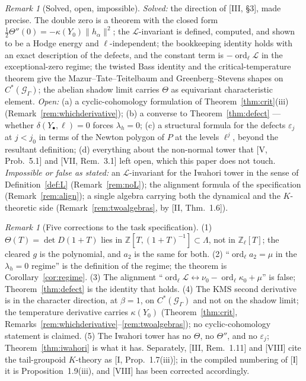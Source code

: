 \documentclass[11pt]{amsart}
\numberwithin{equation}{section}
\theoremstyle{definition}
\theoremstyle{remark}
\newtheorem{remark}[theorem]{Remark}
\newcommand{\Z}{\mathbb{Z}}
\newcommand{\Zl}{\Z_\ell}
\newcommand{\La}{\Lambda}
\newcommand{\cG}{\mathcal{G}}
\newcommand{\cL}{\mathcal{L}}
\newcommand{\ord}{\operatorname{ord}}
\begin{document}
\begin{remark}[Solved, open, impossible]\label{rem:scope}
\emph{Solved:} the direction of [III, \S3], made precise. The double zero is a theorem
with the closed form $\frac12\Theta''(0)=-\kappa(Y_0)\|h_\alpha\|^{2}$; the $\cL$-invariant
is defined, computed, and shown to be a Hodge energy and $\ell$-independent; the
bookkeeping identity holds with an exact description of the defects, and the constant
term is $-\ord_\ell\cL$ in the exceptional-zero regime; the twisted Bass identity and
the critical-temperature theorem give the Mazur--Tate--Teitelbaum and
Greenberg--Stevens shapes on $C^*(\cG_\Gamma)$; the abelian shadow limit carries
$\Theta$ as equivariant characteristic element. \emph{Open:} (a) a cyclic-cohomology
formulation of Theorem~\ref{thm:crit}(iii) (Remark~\ref{rem:whichderivative}); (b) a
converse to Theorem~\ref{thm:defect} --- whether $\delta(Y_\bullet,\ell)=0$ forces
$\lambda_h=0$; (c) a structural formula for the defects $\varepsilon_j$ at $j<j_0$ in
terms of the Newton polygon of $P$ at the levels $\ell^{j}$, beyond the resultant
definition; (d) everything about the non-normal tower that [V, Prob.~5.1] and
[VII, Rem.~3.1] left open, which this paper does not touch. \emph{Impossible or
false as stated:} an $\cL$-invariant for the Iwahori tower in the sense of
Definition~\ref{def:L} (Remark~\ref{rem:noL}); the alignment formula of the
specification (Remark~\ref{rem:align}); a single algebra carrying both the dynamical
and the $K$-theoretic side (Remark~\ref{rem:twoalgebras}, by [II, Thm.~1.6]).
\end{remark}

\begin{remark}[Five corrections to the task specification]\label{rem:corrections}
(1) $\Theta(T)=\det D(1+T)$ lies in $\Z[T,(1+T)^{-1}]\subset\La$, not in $\Zl[T]$; the
cleared $g$ is the polynomial, and $a_2$ is the same for both. (2)
``$\ord_\ell a_2=\mu$ in the $\lambda_h=0$ regime'' is the definition of the regime;
the theorem is Corollary~\ref{cor:regime}. (3) The alignment
``$\ord_\ell\cL\leftrightarrow\nu_0-\ord_\ell\kappa_0+\mu$'' is false;
Theorem~\ref{thm:defect} is the identity that holds. (4) The KMS second derivative is in
the character direction, at $\beta=1$, on $C^*(\cG_\Gamma)$ and not on the shadow limit;
the temperature derivative carries $\kappa(Y_0)$ (Theorem~\ref{thm:crit},
Remarks~\ref{rem:whichderivative}--\ref{rem:twoalgebras}); no cyclic-cohomology
statement is claimed. (5) The Iwahori tower has no $\Theta$, no $\Theta''$, and no
$\varepsilon_j$; Theorem~\ref{thm:iwahori} is what it has. Separately, [III, Rem.~1.11]
and [VIII] cite the tail-groupoid $K$-theory as [I, Prop.~1.7(iii)]; in the compiled
numbering of [I] it is Proposition~1.9(iii), and [VIII] has been corrected accordingly.
\end{remark}
\end{document}
